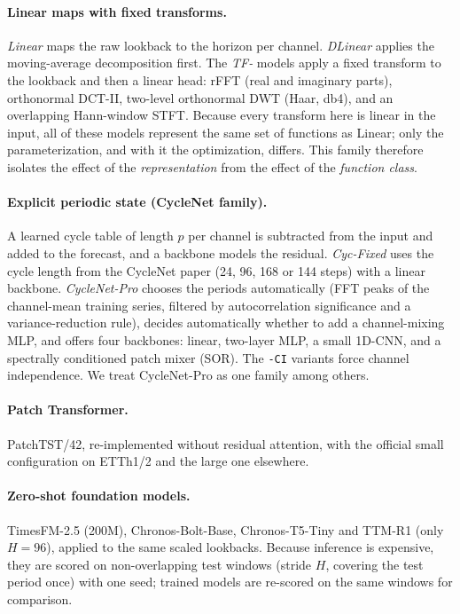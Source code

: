 \documentclass[11pt,a4paper]{article}
\begin{document}
\paragraph{Linear maps with fixed transforms.} \emph{Linear} maps the raw lookback to the horizon per channel. \emph{DLinear} applies the moving-average decomposition first. The \emph{TF-} models apply a fixed transform to the lookback and then a linear head: rFFT (real and imaginary parts), orthonormal DCT-II, two-level orthonormal DWT (Haar, db4), and an overlapping Hann-window STFT. Because every transform here is linear in the input, all of these models represent the same set of functions as Linear; only the parameterization, and with it the optimization, differs. This family therefore isolates the effect of the \emph{representation} from the effect of the \emph{function class}.

\paragraph{Explicit periodic state (CycleNet family).} A learned cycle table of length $p$ per channel is subtracted from the input and added to the forecast, and a backbone models the residual. \emph{Cyc-Fixed} uses the cycle length from the CycleNet paper (24, 96, 168 or 144 steps) with a linear backbone. \emph{CycleNet-Pro} chooses the periods automatically (FFT peaks of the channel-mean training series, filtered by autocorrelation significance and a variance-reduction rule), decides automatically whether to add a channel-mixing MLP, and offers four backbones: linear, two-layer MLP, a small 1D-CNN, and a spectrally conditioned patch mixer (SOR). The \texttt{-CI} variants force channel independence. We treat CycleNet-Pro as one family among others.

\paragraph{Patch Transformer.} PatchTST/42, re-implemented without residual attention, with the official small configuration on ETTh1/2 and the large one elsewhere.

\paragraph{Zero-shot foundation models.} TimesFM-2.5 (200M), Chronos-Bolt-Base, Chronos-T5-Tiny and TTM-R1 (only $H{=}96$), applied to the same scaled lookbacks. Because inference is expensive, they are scored on non-overlapping test windows (stride $H$, covering the test period once) with one seed; trained models are re-scored on the same windows for comparison.
\end{document}
